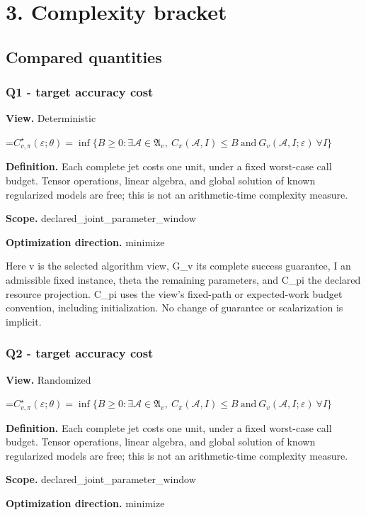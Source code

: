 \documentclass[10pt,a4paper]{article}
\newcommand{\AtlasMath}[1]{\par\begingroup\centering\setbox0=\hbox{$\displaystyle #1$}\ifdim\wd0>1.4\linewidth\typeout{ATLAS WIDE FORMULA: \the\wd0}\fi\ifdim\wd0>\linewidth\resizebox{\linewidth}{!}{\box0}\else\box0\fi\par\endgroup}
\begin{document}
\section{3. Complexity bracket}
\subsection{Compared quantities}
\subsubsection{Q1 - target accuracy cost}
\textbf{View.} Deterministic

\AtlasMath{C^\star_{v,\pi}(\varepsilon;\theta)=\inf\{B\ge0:\exists\mathcal A\in\mathfrak A_v,\ C_\pi(\mathcal A,I)\le B\ \text{and}\ G_v(\mathcal A,I;\varepsilon)\ \forall I\}}
\textbf{Definition.} Each complete jet costs one unit, under a fixed worst-case call budget. Tensor operations, linear algebra, and global solution of known regularized models are free; this is not an arithmetic-time complexity measure.

\textbf{Scope.} declared\_joint\_parameter\_window

\textbf{Optimization direction.} minimize

Here v is the selected algorithm view, G\_v its complete success guarantee, I an admissible fixed instance, theta the remaining parameters, and C\_pi the declared resource projection. C\_pi uses the view's fixed-path or expected-work budget convention, including initialization. No change of guarantee or scalarization is implicit.

\subsubsection{Q2 - target accuracy cost}
\textbf{View.} Randomized

\AtlasMath{C^\star_{v,\pi}(\varepsilon;\theta)=\inf\{B\ge0:\exists\mathcal A\in\mathfrak A_v,\ C_\pi(\mathcal A,I)\le B\ \text{and}\ G_v(\mathcal A,I;\varepsilon)\ \forall I\}}
\textbf{Definition.} Each complete jet costs one unit, under a fixed worst-case call budget. Tensor operations, linear algebra, and global solution of known regularized models are free; this is not an arithmetic-time complexity measure.

\textbf{Scope.} declared\_joint\_parameter\_window

\textbf{Optimization direction.} minimize
\end{document}
